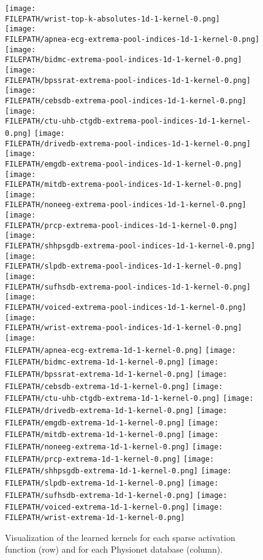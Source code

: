 \documentclass[journal]{IEEEtran}
\providecommand{\FILEPATH}{~/github.com/pbizopoulos/sparsely-activated-networks/packages/default/tmp}
\begin{document}
\begin{figure*}[!t]
  \texttt{[image: \\FILEPATH/wrist-top-k-absolutes-1d-1-kernel-0.png]}
  \\
  \texttt{[image: \\FILEPATH/apnea-ecg-extrema-pool-indices-1d-1-kernel-0.png]}
  \texttt{[image: \\FILEPATH/bidmc-extrema-pool-indices-1d-1-kernel-0.png]}
  \texttt{[image: \\FILEPATH/bpssrat-extrema-pool-indices-1d-1-kernel-0.png]}
  \texttt{[image: \\FILEPATH/cebsdb-extrema-pool-indices-1d-1-kernel-0.png]}
  \texttt{[image: \\FILEPATH/ctu-uhb-ctgdb-extrema-pool-indices-1d-1-kernel-0.png]}
  \texttt{[image: \\FILEPATH/drivedb-extrema-pool-indices-1d-1-kernel-0.png]}
  \texttt{[image: \\FILEPATH/emgdb-extrema-pool-indices-1d-1-kernel-0.png]}
  \texttt{[image: \\FILEPATH/mitdb-extrema-pool-indices-1d-1-kernel-0.png]}
  \texttt{[image: \\FILEPATH/noneeg-extrema-pool-indices-1d-1-kernel-0.png]}
  \texttt{[image: \\FILEPATH/prcp-extrema-pool-indices-1d-1-kernel-0.png]}
  \texttt{[image: \\FILEPATH/shhpsgdb-extrema-pool-indices-1d-1-kernel-0.png]}
  \texttt{[image: \\FILEPATH/slpdb-extrema-pool-indices-1d-1-kernel-0.png]}
  \texttt{[image: \\FILEPATH/sufhsdb-extrema-pool-indices-1d-1-kernel-0.png]}
  \texttt{[image: \\FILEPATH/voiced-extrema-pool-indices-1d-1-kernel-0.png]}
  \texttt{[image: \\FILEPATH/wrist-extrema-pool-indices-1d-1-kernel-0.png]}
  \\
  \texttt{[image: \\FILEPATH/apnea-ecg-extrema-1d-1-kernel-0.png]}
  \texttt{[image: \\FILEPATH/bidmc-extrema-1d-1-kernel-0.png]}
  \texttt{[image: \\FILEPATH/bpssrat-extrema-1d-1-kernel-0.png]}
  \texttt{[image: \\FILEPATH/cebsdb-extrema-1d-1-kernel-0.png]}
  \texttt{[image: \\FILEPATH/ctu-uhb-ctgdb-extrema-1d-1-kernel-0.png]}
  \texttt{[image: \\FILEPATH/drivedb-extrema-1d-1-kernel-0.png]}
  \texttt{[image: \\FILEPATH/emgdb-extrema-1d-1-kernel-0.png]}
  \texttt{[image: \\FILEPATH/mitdb-extrema-1d-1-kernel-0.png]}
  \texttt{[image: \\FILEPATH/noneeg-extrema-1d-1-kernel-0.png]}
  \texttt{[image: \\FILEPATH/prcp-extrema-1d-1-kernel-0.png]}
  \texttt{[image: \\FILEPATH/shhpsgdb-extrema-1d-1-kernel-0.png]}
  \texttt{[image: \\FILEPATH/slpdb-extrema-1d-1-kernel-0.png]}
  \texttt{[image: \\FILEPATH/sufhsdb-extrema-1d-1-kernel-0.png]}
  \texttt{[image: \\FILEPATH/voiced-extrema-1d-1-kernel-0.png]}
  \texttt{[image: \\FILEPATH/wrist-extrema-1d-1-kernel-0.png]}
  \caption{Visualization of the learned kernels for each sparse activation function (row) and for each Physionet database (column).
  }\label{fig:kernelvisualization}
\end{figure*}
\end{document}
